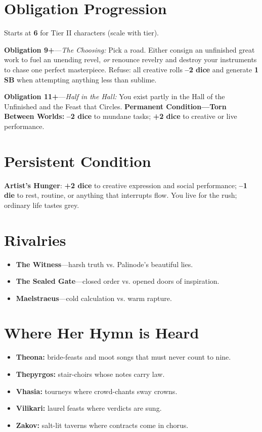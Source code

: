 \section*{Obligation Progression}
\label{sec:palinode-obligation}
Starts at \textbf{6} for Tier II characters (scale with tier).

\textbf{Obligation 9+}---\emph{The Choosing:} Pick a road. Either consign an unfinished great work to fuel an unending revel, \emph{or} renounce revelry and destroy your instruments to chase one perfect masterpiece. Refuse: all creative rolls \textbf{--2 dice} and generate \textbf{1 SB} when attempting anything less than sublime.

\textbf{Obligation 11+}---\emph{Half in the Hall:} You exist partly in the Hall of the Unfinished and the Feast that Circles. \textbf{Permanent Condition---Torn Between Worlds:} \textbf{--2 dice} to mundane tasks; \textbf{+2 dice} to creative or live performance.

\section*{Persistent Condition}
\label{sec:palinode-condition}
\textbf{Artist's Hunger}: \textbf{+2 dice} to creative expression and social performance; \textbf{--1 die} to rest, routine, or anything that interrupts flow. You live for the rush; ordinary life tastes grey.

\section*{Rivalries}
\label{sec:palinode-rivals}
\begin{itemize}
\item \textbf{The Witness}---harsh truth vs. Palinode's beautiful lies.
\item \textbf{The Sealed Gate}---closed order vs. opened doors of inspiration.
\item \textbf{Maelstraeus}---cold calculation vs. warm rapture.
\end{itemize}

\section*{Where Her Hymn is Heard}
\label{sec:palinode-hooks}
\begin{itemize}
\item \textbf{Theona:} bride-feasts and moot songs that must never count to nine.
\item \textbf{Thepyrgos:} stair-choirs whose notes carry law.
\item \textbf{Vhasia:} tourneys where crowd-chants sway crowns.
\item \textbf{Vilikari:} laurel feasts where verdicts are sung.
\item \textbf{Zakov:} salt-lit taverns where contracts come in chorus.
\end{itemize}

